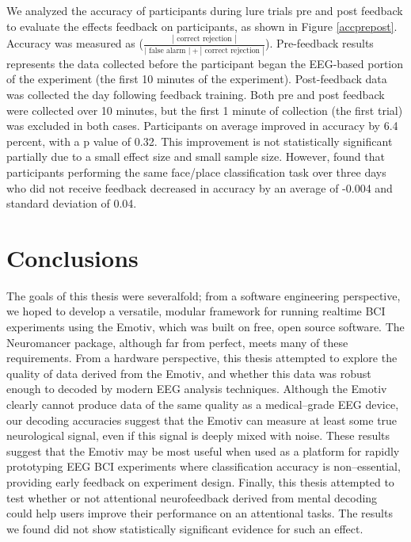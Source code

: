 \documentclass[12pt]{report}
\begin{document}
	We analyzed the accuracy of participants during lure trials pre and post feedback to evaluate the effects feedback on participants, as shown in Figure \ref{accprepost}.  Accuracy was measured as ($\frac{|\text{ correct rejection }|}{|\text{ false alarm }| + |\text{ correct rejection }|}$).  Pre-feedback results represents the data collected before the participant began the EEG-based portion of the experiment (the first 10 minutes of the experiment).  Post-feedback data was collected the day following feedback training.  Both pre and post feedback were collected over 10 minutes, but the first 1 minute of collection (the first trial) was excluded in both cases.  Participants on average improved in accuracy by 6.4 percent, with a p value of 0.32.  This improvement is not statistically significant partially due to a small effect size and small sample size.  However, \cite{deBettencourt} found that participants performing the same face/place classification task over three days who did not receive feedback decreased in accuracy by an average of -0.004 and standard deviation of 0.04.  

\chapter{Conclusions}

	The goals of this thesis were severalfold; from a software engineering perspective, we hoped to develop a versatile, modular framework for running realtime BCI experiments using the Emotiv, which was built on free, open source software.  The Neuromancer package, although far from perfect, meets many of these requirements.  From a hardware perspective, this thesis attempted to explore the quality of data derived from the Emotiv, and whether this data was robust enough to decoded by modern EEG analysis techniques.  Although the Emotiv clearly cannot produce data of the same quality as a medical--grade EEG device, our decoding accuracies suggest that the Emotiv can measure at least some true neurological signal, even if this signal is deeply mixed with noise.  These results suggest that the Emotiv may be most useful when used as a platform for rapidly prototyping EEG BCI experiments where classification accuracy is non--essential, providing early feedback on experiment design.  Finally, this thesis attempted to test whether or not attentional neurofeedback derived from mental decoding could help users improve their performance on an attentional tasks.  The results we found did not show statistically significant evidence for such an effect.  
\end{document}
